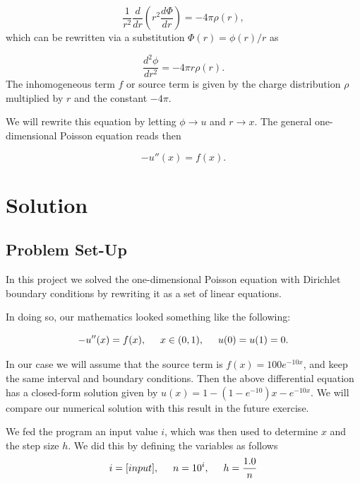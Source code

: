 \documentclass{article}
\begin{document}
		\begin{equation*}
		\frac{1}{r^2}\frac{d}{dr}\left(r^2\frac{d\Phi}{dr}\right) = -4\pi \rho(r),
		\end{equation*}
		which can be rewritten via a substitution $\Phi(r)= \phi(r)/r$ as
		
		\begin{equation*}
		\frac{d^2\phi}{dr^2}= -4\pi r\rho(r).
		\end{equation*}
		The inhomogeneous term $f$ or source term is given by the charge distribution
		$\rho$  multiplied by $r$ and the constant $-4\pi$.
		
		We will rewrite this equation by letting $\phi\rightarrow u$ and 
		$r\rightarrow x$. 
		The general one-dimensional Poisson equation reads then
		
		\begin{equation*}
		-u''(x) = f(x).
		\end{equation*}
		

\section{Solution}
\subsection{Problem Set-Up}
In this project we solved the one-dimensional Poisson equation with Dirichlet boundary conditions by rewriting it as a set of linear equations.

In doing so, our mathematics looked something like the following:

\begin{equation*}
-u''(x) = f(x), \hspace{0.5cm} x\in(0,1), \hspace{0.5cm} u(0) = u(1) = 0.
\end{equation*}

In our case we will assume  that the source term is 
$f(x) = 100e^{-10x}$, and keep the same interval and boundary  conditions. Then the above differential equation
has a closed-form  solution given by $u(x) = 1-(1-e^{-10})x-e^{-10x}$. We will compare
our numerical solution with this result in the future exercise.

We fed the program an input value $i$, which was then used to determine $x$ and the step size $h$. We did this by defining the variables as follows
\begin{equation*}
i = [input], \hspace{0.5cm} n = 10^{i},\hspace{0.5cm}  h = \frac{1.0}{n}
\end{equation*}
\end{document}
